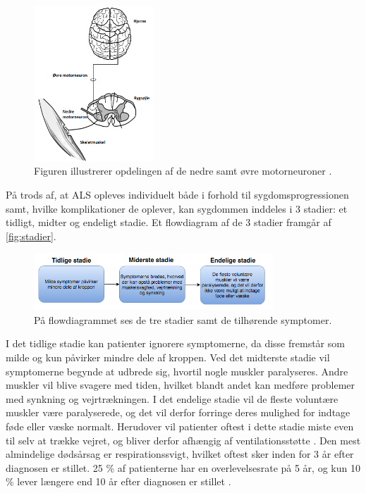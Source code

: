 \begin{figure}[H]
\centering
\includegraphics[width=0.4\textwidth]{figures/motorneuroner.png}
\caption{Figuren illustrerer opdelingen af de nedre samt øvre motorneuroner \citep{miller2005}.}
\label{fig:motorneuroner}
\end{figure}

På trods af, at ALS opleves individuelt både i forhold til sygdomsprogressionen samt, hvilke komplikationer de oplever, kan sygdommen inddeles i 3 stadier: et tidligt, midter og endeligt stadie. Et flowdiagram af de 3 stadier framgår af \autoref{fig:stadier}.

\begin{figure}[H]
\centering
\includegraphics[width=0.8\textwidth]{figures/stadier.png}
\caption{På flowdiagrammet ses de tre stadier samt de tilhørende symptomer.}
\label{fig:stadier}
\end{figure}

I det tidlige stadie kan patienter ignorere symptomerne, da disse fremstår som milde og kun påvirker mindre dele af kroppen. 
Ved det midterste stadie vil symptomerne begynde at udbrede sig, hvortil nogle muskler paralyseres. Andre muskler vil blive svagere med tiden, hvilket blandt andet kan medføre problemer med synkning og vejrtrækningen. I det endelige stadie vil de fleste voluntære muskler være paralyserede, og det vil derfor forringe deres mulighed for indtage føde eller væske normalt. Herudover vil patienter oftest i dette stadie miste even til selv at trække vejret, og bliver derfor afhængig af ventilationsstøtte \citep{themusculardystrophyassociation2016}.
Den mest almindelige dødsårsag er respirationssvigt, hvilket oftest sker inden for 3 år efter diagnosen er stillet. 25 \% af patienterne har en overlevelsesrate på 5 år, og kun 10 \% lever længere end 10 år efter diagnosen er stillet \citep{grehl2011, miller2005}.




